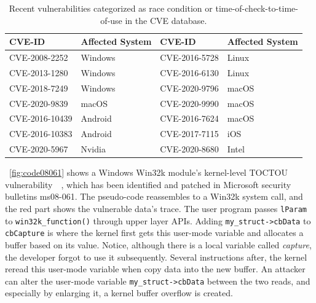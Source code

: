 \vspace*{-\baselineskip}

\begin{center}
\begin{table}[ht]
\small
\caption{Recent vulnerabilities categorized as race condition or time-of-check-to-time-of-use in the CVE database.}
\label{table:cves}
\centering
	\begin{tabular}{@{}>{\raggedright\arraybackslash}m{2.40cm}@{}|
			@{}>{\centering\arraybackslash}m{1.50cm}@{}|
			@{}>{\centering\arraybackslash}m{2.40cm}@{}|
			@{}>{\centering\arraybackslash}m{1.35cm}@{} } 
\hline
CVE-ID & Affected System & CVE-ID & Affected System \\ %
\hline
CVE-2008-2252  & Windows & CVE-2016-5728 & Linux \\
CVE-2013-1280  & Windows & CVE-2016-6130 & Linux \\
CVE-2018-7249  & Windows & CVE-2020-9796 & macOS \\ 
CVE-2020-9839  & macOS   & CVE-2020-9990 & macOS \\
CVE-2016-10439 & Android & CVE-2016-7624 & macOS \\
CVE-2016-10383 & Android & CVE-2017-7115 & iOS   \\

CVE-2020-5967  & Nvidia  & CVE-2020-8680 & Intel \\
\hline
\end{tabular}
\end{table}
\end{center}

\vspace*{-\baselineskip}



~\autoref{fig:code08061} shows a Windows Win32k module's kernel-level TOCTOU vulnerability~\cite{jurczyk2013identifying}~\cite{ms08061}, which has been identified and patched in Microsoft security bulletins ms08-061. The pseudo-code reassembles to a Win32k system call, and the red part shows the vulnerable data's trace.  The user program passes \texttt{lParam} to \texttt{win32k\_function()} through upper layer APIs.  Adding \texttt{my\_struct->cbData} to \texttt{cbCapture} is where the kernel first gets this user-mode variable and allocates a buffer based on its value. Notice, although there is a local variable called \textit{capture}, the developer forgot to use it subsequently.  Several instructions after, the kernel reread this user-mode variable when copy data into the new buffer.  An attacker can alter the user-mode variable \texttt{my\_struct->cbData} between the two reads, and especially by enlarging it, a kernel buffer overflow is created.



